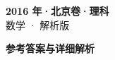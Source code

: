 \documentclass[zihao=-4, a4paper]{ctexart}
\begin{document}
\begin{center}
  {\Large\bfseries 2016 年·北京卷·理科}\\[4pt]
  {\large 数学 · 解析版}
\end{center}
\medskip
{}

\clearpage
{}
\begin{center}{\Large\bfseries 参考答案与详细解析}\end{center}
\medskip

\end{document}
